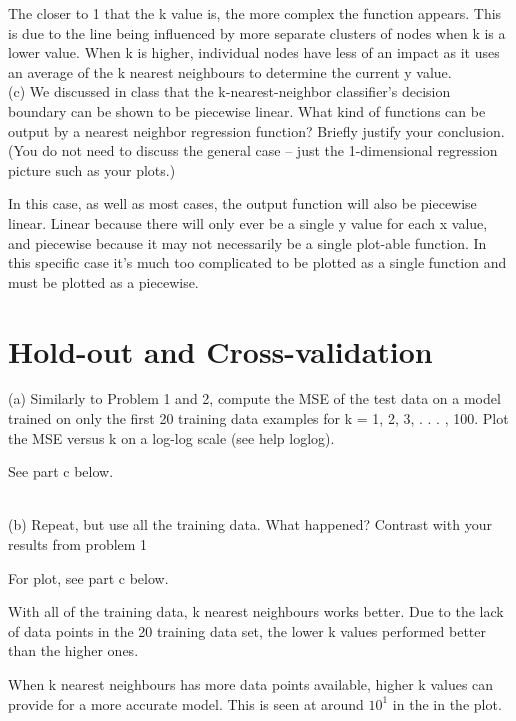 \documentclass[]{report}   %
\begin{document}
The closer to 1 that the k value is, the more complex the function appears. This is due to the line being influenced by more separate clusters of nodes when k is a lower value. When k is higher, individual nodes have less of an impact as it uses an average of the k nearest neighbours to determine the current y value.
\newline
~\\
(c) We discussed in class that the k-nearest-neighbor classifier’s decision boundary can be shown to be piecewise linear. What kind of functions can be output by a nearest neighbor regression function? Briefly justify your conclusion. (You do not need to discuss the general case – just the 1-dimensional regression picture such as your plots.)
\newline

In this case, as well as most cases, the output function will also be piecewise linear. Linear because there will only ever be a single y value for each x value, and piecewise because it may not necessarily be a single plot-able function. In this specific case it's much too complicated to be plotted as a single function and must be plotted as a piecewise.


\section{Hold-out and Cross-validation}
(a) Similarly to Problem 1 and 2, compute the MSE of the test data on a model trained on only the first 20 training data examples for k = 1, 2, 3, . . . , 100. Plot the MSE versus k on a log-log scale (see help loglog).
\newline

See part c below.

~\\
(b) Repeat, but use all the training data. What happened? Contrast with your results from problem 1
\newline

For plot, see part c below.
\newline

With all of the training data, k nearest neighbours works better. Due to the lack of data points in the 20 training data set, the lower k values performed better than the higher ones. 
\newline

When k nearest neighbours has more data points available, higher k values can provide for a more accurate model. This is seen at around $10^1$ in the in the plot.
\end{document}
